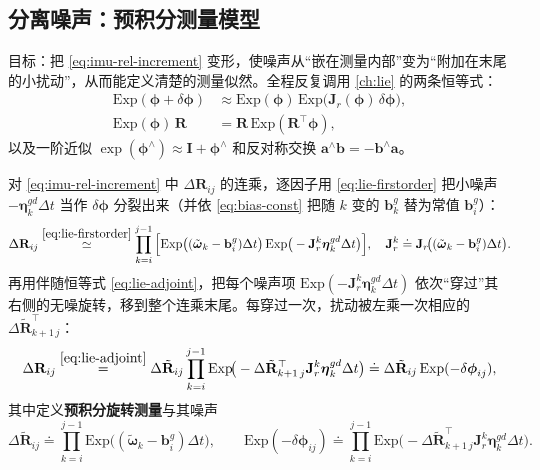 \subsection{分离噪声：预积分测量模型}
\label{subsec:noise-separation}

目标：把 \cref{eq:imu-rel-increment} 变形，使噪声从“嵌在测量内部”变为“附加在末尾的小扰动”，从而能定义清楚的测量似然。全程反复调用 \cref{ch:lie} 的两条恒等式：
\begin{align}
  \mathrm{Exp}(\boldsymbol\phi+\delta\boldsymbol\phi)&\approx\mathrm{Exp}(\boldsymbol\phi)\,\mathrm{Exp}\!\big(\mathbf J_r(\boldsymbol\phi)\,\delta\boldsymbol\phi\big),\label{eq:lie-firstorder}\\
  \mathrm{Exp}(\boldsymbol\phi)\,\mathbf R&=\mathbf R\,\mathrm{Exp}(\mathbf R^\top\boldsymbol\phi),\label{eq:lie-adjoint}
\end{align}
以及一阶近似 $\exp(\boldsymbol\phi^\wedge)\approx\mathbf I+\boldsymbol\phi^\wedge$ 和反对称交换 $\mathbf a^\wedge\mathbf b=-\mathbf b^\wedge\mathbf a$。

\begin{derivation}[旋转增量的噪声分离]
对 \cref{eq:imu-rel-increment} 中 $\Delta\mathbf R_{ij}$ 的连乘，逐因子用 \cref{eq:lie-firstorder} 把小噪声 $-\boldsymbol\eta_k^{gd}\Delta t$ 当作 $\delta\boldsymbol\phi$ 分裂出来（并依 \cref{eq:bias-const} 把随 $k$ 变的 $\mathbf b_k^g$ 替为常值 $\mathbf b_i^g$）：
\[
  \Delta\mathbf R_{ij}\overset{\eqref{eq:lie-firstorder}}{\simeq}\prod_{k=i}^{j-1}\Big[\mathrm{Exp}\big((\tilde{\boldsymbol\omega}_k-\mathbf b_i^g)\Delta t\big)\,\mathrm{Exp}\big(-\mathbf J_r^k\boldsymbol\eta_k^{gd}\Delta t\big)\Big],
  \quad \mathbf J_r^k\doteq\mathbf J_r\!\big((\tilde{\boldsymbol\omega}_k-\mathbf b_i^g)\Delta t\big).
\]
再用伴随恒等式 \cref{eq:lie-adjoint}，把每个噪声项 $\mathrm{Exp}(-\mathbf J_r^k\boldsymbol\eta_k^{gd}\Delta t)$ 依次“穿过”其右侧的无噪旋转，移到整个连乘末尾。每穿过一次，扰动被左乘一次相应的 $\Delta\tilde{\mathbf R}_{k+1\,j}^\top$：
\[
  \Delta\mathbf R_{ij}\overset{\eqref{eq:lie-adjoint}}{=}\Delta\tilde{\mathbf R}_{ij}\prod_{k=i}^{j-1}\mathrm{Exp}\!\big(-\Delta\tilde{\mathbf R}_{k+1\,j}^\top\mathbf J_r^k\boldsymbol\eta_k^{gd}\Delta t\big)\doteq\Delta\tilde{\mathbf R}_{ij}\,\mathrm{Exp}(-\delta\boldsymbol\phi_{ij}),
\]
其中定义\textbf{预积分旋转测量}与其噪声
\[
  \Delta\tilde{\mathbf R}_{ij}\doteq\prod_{k=i}^{j-1}\mathrm{Exp}\!\big((\tilde{\boldsymbol\omega}_k-\mathbf b_i^g)\Delta t\big),\qquad
  \mathrm{Exp}(-\delta\boldsymbol\phi_{ij})\doteq\prod_{k=i}^{j-1}\mathrm{Exp}\!\big(-\Delta\tilde{\mathbf R}_{k+1\,j}^\top\mathbf J_r^k\boldsymbol\eta_k^{gd}\Delta t\big).
\]
\end{derivation}

